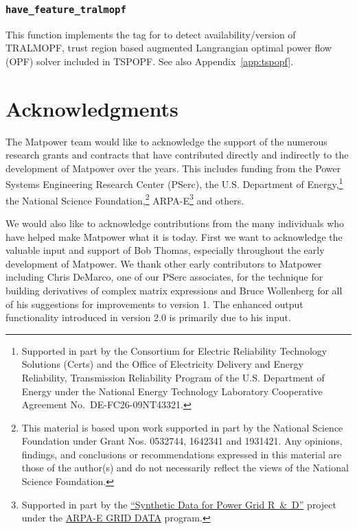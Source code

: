 \documentclass[12pt]{article}
\newcommand{\matpower}[0]{{\sc Matpower}}
\newcommand{\pserc}[0]{{\sc PSerc}}
\newcommand{\PSERC}[0]{{Power Systems Engineering Research Center (\pserc{})}}
\newcommand{\certs}[0]{{\sc Certs}}
\newcommand{\CERTS}[0]{{Consortium for Electric Reliability Technology Solutions (\certs{})}}
\newcommand{\code}[1]{{\relsize{-0.5}{\tt{{#1}}}}}  %
\newcommand{\codeq}[1]{\code{\textquotesingle{}#1\textquotesingle}}  %
\numberwithin{equation}{section}
\numberwithin{table}{section}
\numberwithin{figure}{section}
\begin{document}
\subsubsection{\tt have\_feature\_tralmopf}
\label{sec:have_feature_tralmopf}

This function implements the \codeq{tralmopf} tag for \code{have\_feature} to detect availability/version of TRALMOPF, trust region based augmented Langrangian optimal power flow (OPF) solver included in TSPOPF. See also Appendix~\ref{app:tspopf}.


\clearpage
\section{Acknowledgments}
The \matpower{} team would like to acknowledge the support of the numerous research grants and contracts that have contributed directly and indirectly to the development of \matpower{} over the years. This includes funding from the \PSERC{}, the U.S. Department of Energy,\footnote{Supported in part by the \CERTS{} and the Office of Electricity Delivery and Energy Reliability, Transmission Reliability Program of the U.S. Department of Energy under the National Energy Technology Laboratory Cooperative Agreement No.~DE-FC26-09NT43321.} the National Science Foundation,\footnote{This material is based upon work supported in part by the National Science Foundation under Grant Nos. 0532744, 1642341 and 1931421. Any opinions, findings, and conclusions or recommendations expressed in this material are those of the author(s) and do not necessarily reflect the views of the National Science Foundation.} ARPA-E\footnote{Supported in part by the \href{https://arpa-e.energy.gov/?q=slick-sheet-project/synthetic-data-power-grid-rd}{``Synthetic Data for Power Grid R~\&~D''} project under the \href{https://arpa-e.energy.gov/?q=arpa-e-programs/grid-data}{ARPA-E GRID DATA} program.} and others.

We would also like to acknowledge contributions from the many individuals who have helped make \matpower{} what it is today. First we want to acknowledge the valuable input and support of Bob Thomas, especially throughout the early development of \matpower{}. We thank other early contributors to \matpower{} including Chris DeMarco, one of our \pserc{} associates, for the technique for building derivatives of complex matrix expressions and Bruce Wollenberg for all of his suggestions for improvements to version 1. The enhanced output functionality introduced in version 2.0 is primarily due to his input.
\end{document}
